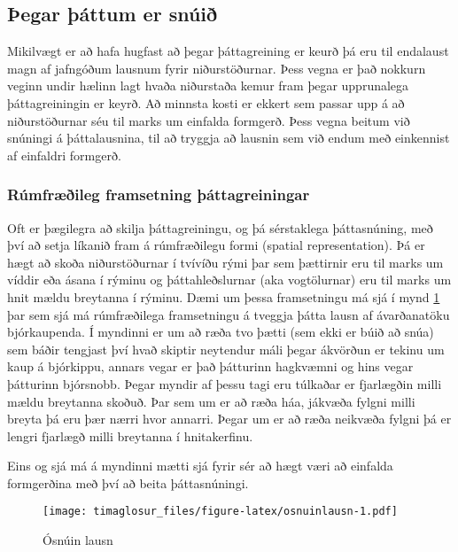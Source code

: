 \documentclass[]{book}
\begin{document}
\hypertarget{uxfeegar-uxfeuxe1ttum-er-snuxfaiuxf0}{%
\subsection{Þegar þáttum er snúið}\label{uxfeegar-uxfeuxe1ttum-er-snuxfaiuxf0}}

Mikilvægt er að hafa hugfast að þegar þáttagreining er keurð þá eru til endalaust magn af jafngóðum lausnum fyrir niðurstöðurnar. Þess vegna er það nokkurn veginn undir hælinn lagt hvaða niðurstaða kemur fram þegar upprunalega þáttagreiningin er keyrð. Að minnsta kosti er ekkert sem passar upp á að niðurstöðurnar séu til marks um einfalda formgerð. Þess vegna beitum við snúningi á þáttalausnina, til að tryggja að lausnin sem við endum með einkennist af einfaldri formgerð.

\hypertarget{ruxfamfruxe6uxf0ileg-framsetning-uxfeuxe1ttagreiningar}{%
\subsubsection{Rúmfræðileg framsetning þáttagreiningar}\label{ruxfamfruxe6uxf0ileg-framsetning-uxfeuxe1ttagreiningar}}

Oft er þægilegra að skilja þáttagreiningu, og þá sérstaklega þáttasnúning, með því að setja líkanið fram á rúmfræðilegu formi (spatial representation). Þá er hægt að skoða niðurstöðurnar í tvívíðu rými þar sem þættirnir eru til marks um víddir eða ásana í rýminu og þáttahleðslurnar (aka vogtölurnar) eru til marks um hnit mældu breytanna í rýminu. Dæmi um þessa framsetningu má sjá í mynd \ref{fig:osnuinlausn} þar sem sjá má rúmfræðilega framsetningu á tveggja þátta lausn af ávarðanatöku bjórkaupenda. Í myndinni er um að ræða tvo þætti (sem ekki er búið að snúa) sem báðir tengjast því hvað skiptir neytendur máli þegar ákvörðun er tekinu um kaup á bjórkippu, annars vegar er það þátturinn hagkvæmni og hins vegar þátturinn bjórsnobb. Þegar myndir af þessu tagi eru túlkaðar er fjarlægðin milli mældu breytanna skoðuð. Þar sem um er að ræða háa, jákvæða fylgni milli breyta þá eru þær nærri hvor annarri. Þegar um er að ræða neikvæða fylgni þá er lengri fjarlægð milli breytanna í hnitakerfinu.

Eins og sjá má á myndinni mætti sjá fyrir sér að hægt væri að einfalda formgerðina með því að beita þáttasnúningi.

\begin{figure}
\centering
\texttt{[image: timaglosur\_files/figure-latex/osnuinlausn-1.pdf]}
\caption{\label{fig:osnuinlausn}Ósnúin lausn}
\end{figure}
\end{document}
